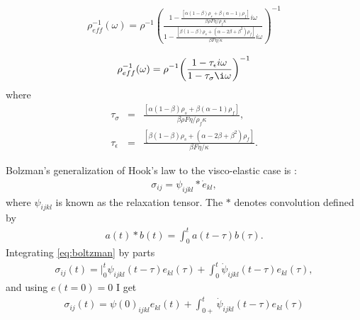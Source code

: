 \documentclass[11pt]{article}
\begin{document}
{\begin{eqnarray}
  \rho^{-1}_{eff}(\omega) = 
\rho^{-1} {\left( 
              \frac{1-\frac{[\alpha(1-\beta)\rho_s + \beta(\alpha-1)\rho_f]}{\beta\rho F \eta/ \rho_f \kappa}i\omega 
              }
              {1-\frac{[\beta(1-\beta)\rho_s + (\alpha -2\beta+\beta^2)\rho_f]}{\beta F \eta/ \kappa} i\omega
              }
       \right)}^{-1}
\end{eqnarray}

\begin{eqnarray}
  \rho^{-1}_{eff}(\omega) = 
\rho^{-1} {\left( 
              \frac{1-\tau_{\epsilon}i\omega} 
                   {1-\tau_{\sigma}\i\omega}
       \right)}^{-1}
\end{eqnarray}
where
\begin{eqnarray}
  \tau_{\sigma}   & = &\frac{[\alpha(1-\beta)\rho_s + \beta(\alpha-1)\rho_f]}
                            {\beta\rho F \eta/ \rho_f \kappa}, \nonumber\\
 \tau_{\epsilon} & = &\frac{[\beta(1-\beta)\rho_s + (\alpha -2\beta+\beta^2)\rho_f]}
                           {\beta F \eta/ \kappa}. 
\end{eqnarray}

Bolzman's generalization of Hook's law to the visco-elastic case is
\citep{Hudson1985}:
\begin{eqnarray}
\sigma_{ij} = \psi_{ijkl}*\dot{e}_{kl},
                  \label{eq:boltzman}
\end{eqnarray}where $\psi_{ijkl}$ is known as the relaxation tensor.
The $*$ denotes convolution defined by
\begin{eqnarray}
a(t)*b(t)=\int_0^t a(t-\tau)b(\tau).
\end{eqnarray}
Integrating \eqref{eq:boltzman} by parts
\begin{eqnarray}
\sigma_{ij}(t)=|_0^t \psi_{ijkl}(t-\tau)e_{kl}(\tau) +\int_0^t \dot{\psi}_{ijkl}(t-\tau)e_{kl}(\tau),
\end{eqnarray}
and using $e(t=0)=0$ I get
\begin{eqnarray}
\sigma_{ij}(t)=\psi(0)_{ijkl}e_{kl}(t) +\int_{0+}^t \dot{\psi}_{ijkl}(t-\tau)e_{kl}(\tau)

\end{eqnarray}}
\end{document}
